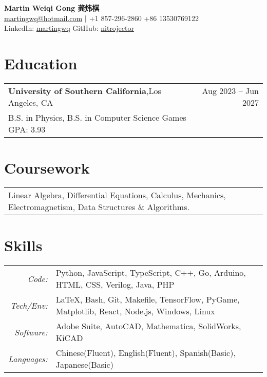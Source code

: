 \documentclass[oneside, 11pt]{article}
\newcommand*{\experienceEntry}[4]{
	\noindent
	\begin{tabularx}{\textwidth}{Xr}
	\textbf{#1},\quad #2 & #3\\
	#4
	\end{tabularx}
	\vspace{-0.75\baselineskip}
}
\begin{document}
\begin{center}
	\Large \textbf{Martin Weiqi Gong 龚炜棋}\\
	\normalsize \href{mailto:martingwq@hotmail.com}{martingwq@hotmail.com} \thinspace \textbf{|} \thinspace +1 857-296-2860 \thinspace +86 13530769122\\
	LinkedIn: \href{https://www.linkedin.com/in/martingwq/}{martingwq} \thinspace GitHub: \href{https://github.com/nitrojector}{nitrojector}
\end{center}

\section*{Education}

\experienceEntry{University of Southern California}
	{Los Angeles, CA}
	{Aug 2023 -- Jun 2027}
	{B.S. in Physics, B.S. in Computer Science Games \quad GPA: 3.93}


\section*{Coursework}

\begin{tabular}{ p{\textwidth - 1em} }
	Linear Algebra, Differential Equations, Calculus, Mechanics, Electromagnetism, Data Structures \& Algorithms.
\end{tabular}

\section*{Skills}

\begin{tabularx}{\textwidth}{rX}
	\textit{Code:} & Python, JavaScript, TypeScript, C++, Go, Arduino, HTML, CSS, Verilog, Java, PHP\\
	\textit{Tech/Env:} & \LaTeX, Bash, Git, Makefile, TensorFlow, PyGame, Matplotlib, React, Node.js, Windows, Linux\\
	\textit{Software:} & Adobe Suite, AutoCAD, Mathematica, SolidWorks, KiCAD\\
	\textit{Languages:} & Chinese(Fluent), English(Fluent), Spanish(Basic), Japanese(Basic)
\end{tabularx}
\end{document}

